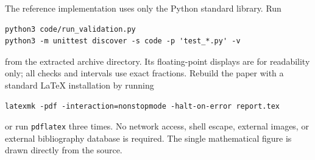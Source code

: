 \documentclass[11pt]{article}
\theoremstyle{definition}
\newcommand{\code}[1]{\texttt{#1}}
\begin{document}
The reference implementation uses only the Python standard library.
Run
\begin{lstlisting}
python3 code/run_validation.py
python3 -m unittest discover -s code -p 'test_*.py' -v
\end{lstlisting}
from the extracted archive directory. Its floating-point displays are
for readability only; all checks and intervals use exact fractions.
Rebuild the paper with a standard \LaTeX{} installation by running
\begin{lstlisting}
latexmk -pdf -interaction=nonstopmode -halt-on-error report.tex
\end{lstlisting}
or run \code{pdflatex} three times. No network access, shell escape,
external images, or external bibliography database is required.
The single mathematical figure is drawn directly from the source.
\end{document}
